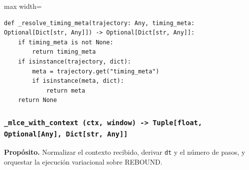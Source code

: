 \begin{listing}[H]
\caption{Bloque de código de \texttt{\_resolve\_timing\_meta}}
\begin{adjustbox}{max width=\textwidth}
\begin{minipage}{\textwidth}
\begin{verbatim}
def _resolve_timing_meta(trajectory: Any, timing_meta: Optional[Dict[str, Any]]) -> Optional[Dict[str, Any]]:
    if timing_meta is not None:
        return timing_meta
    if isinstance(trajectory, dict):
        meta = trajectory.get("timing_meta")
        if isinstance(meta, dict):
            return meta
    return None
\end{verbatim}
\end{minipage}
\end{adjustbox}
\end{listing}
\vspace{0.2cm}

\subsubsection*{\texttt{\_mlce\_with\_context~(ctx, window) -> Tuple[float, Optional[Any], Dict[str, Any]]}}
\vfill
\textbf{Propósito.} Normalizar el contexto recibido, derivar \texttt{dt} y el número de pasos, y orquestar la ejecución variacional sobre REBOUND.\\

